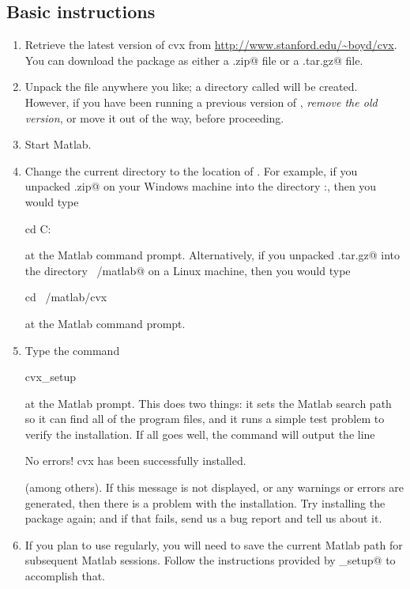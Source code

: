 \documentclass[12pt]{article}
\begin{document}
\subsection{Basic instructions}
\label{sec:winlin}

\begin{enumerate}
\item Retrieve the latest version of cvx from \url{http://www.stanford.edu/~boyd/cvx}.
You can download the package as either a \verb@.zip@ file or a \verb@.tar.gz@ 
file.
\item Unpack the file anywhere you like; a directory called \verb@cvx@ will be created.
However, if you have been running a previous version of \cvx, \emph{remove the old 
version}, or move it out of the way, before proceeding.
\item Start Matlab.
\item Change the current directory to the location of \cvx.
For example, if you unpacked \verb@cvx.zip@ on your Windows machine into the
directory \verb@C:\Matlab\personal@, then you would type
\begin{code}
		cd C:\Matlab\personal\cvx
\end{code}
at the Matlab command prompt. Alternatively, if you unpacked \verb@cvx.tar.gz@
into the directory \verb@~/matlab@ on a Linux machine, then you would type
\begin{code}
		cd ~/matlab/cvx
\end{code}
at the Matlab command prompt.
\item Type the command
\begin{code}
		cvx_setup
\end{code}
at the Matlab prompt. This does two things: 
it sets the Matlab search path so it can find all of the \cvx program files,
and it runs a simple test problem to verify the installation.
If all goes well, the command will output the line
\begin{code}
	No errors! cvx has been successfully installed.
\end{code}
(among others). If this message is not displayed, or any warnings or errors are generated,
then there is a problem with the \cvx installation. Try installing the package
again; and if that fails, send us a bug report and tell us about it.
\item If you plan to use \cvx regularly, you will need to save the current
Matlab path for subsequent Matlab sessions. Follow the instructions provided
by \verb@cvx_setup@ to accomplish that.
\end{enumerate}
\end{document}
